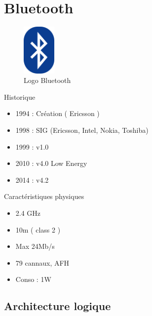 \section{Bluetooth}
\begin{frame}

\begin{minipage}[t]{0.25\linewidth}

\begin{figure}
\includegraphics[height=2.5cm]{bt_logo.png}
\caption{Logo Bluetooth}
\end{figure}

\end{minipage}\hfill
\begin{minipage}[t]{0.72\linewidth}
\begin{block}{Historique}
\begin{itemize}
	\item 1994 : Création ( Ericsson )
	\item 1998 : SIG (Ericsson, Intel, Nokia, Toshiba)
	\item 1999 : v1.0
	\item 2010 : v4.0 Low Energy
	\item 2014 : v4.2
\end{itemize}
\end{block}
\begin{block}{Caractéristiques physiques}
\begin{itemize}
\item 2.4 GHz
\item 10m ( class 2 )
\item Max 24Mb/s
\item 79 cannaux, AFH
\item Conso : 1W
\end{itemize}
\end{block}

\end{minipage}
\end{frame}

\subsection{Architecture logique}

